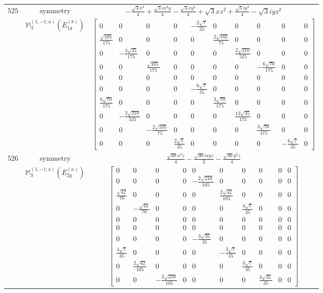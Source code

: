 \documentclass[fleqn,8pt,landscape]{jsarticle}
\begin{document}
\begin{longtable}{ccc}
$ 525 $ & $ \text{symmetry} $ & $ - \frac{\sqrt{3} x^{3}}{4} + \frac{\sqrt{3} i x^{2} y}{4} - \frac{\sqrt{3} x y^{2}}{4} + \sqrt{3} x z^{2} + \frac{\sqrt{3} i y^{3}}{4} - \sqrt{3} i y z^{2} $ \\
$  $ & $ \mathbb{M}_{3}^{(1,-1;a)}(E_{1g}^{(b)}) $ & $ \begin{bmatrix} 0 & 0 & 0 & 0 & - \frac{2 \sqrt{7}}{35} & 0 & 0 & 0 & 0 & 0 \\ \frac{\sqrt{105}}{175} & 0 & 0 & 0 & 0 & \frac{2 \sqrt{105}}{75} & 0 & 0 & 0 & 0 \\ 0 & - \frac{3 \sqrt{35}}{175} & 0 & 0 & 0 & 0 & \frac{2 \sqrt{210}}{525} & 0 & 0 & 0 \\ 0 & 0 & \frac{\sqrt{105}}{175} & 0 & 0 & 0 & 0 & - \frac{6 \sqrt{70}}{175} & 0 & 0 \\ 0 & 0 & 0 & 0 & 0 & 0 & 0 & 0 & 0 & 0 \\ 0 & 0 & 0 & 0 & - \frac{6 \sqrt{7}}{35} & 0 & 0 & 0 & 0 & 0 \\ \frac{6 \sqrt{70}}{175} & 0 & 0 & 0 & 0 & \frac{3 \sqrt{70}}{175} & 0 & 0 & 0 & 0 \\ 0 & - \frac{2 \sqrt{210}}{525} & 0 & 0 & 0 & 0 & \frac{12 \sqrt{35}}{175} & 0 & 0 & 0 \\ 0 & 0 & - \frac{2 \sqrt{105}}{75} & 0 & 0 & 0 & 0 & \frac{3 \sqrt{70}}{175} & 0 & 0 \\ 0 & 0 & 0 & \frac{2 \sqrt{7}}{35} & 0 & 0 & 0 & 0 & - \frac{6 \sqrt{7}}{35} & 0 \end{bmatrix} $ \\ \hline
$ 526 $ & $ \text{symmetry} $ & $ \frac{\sqrt{30} x^{2} z}{4} - \frac{\sqrt{30} i x y z}{2} - \frac{\sqrt{30} y^{2} z}{4} $ \\
$  $ & $ \mathbb{M}_{3}^{(1,-1;a)}(E_{2g}^{(a)}) $ & $ \begin{bmatrix} 0 & 0 & 0 & 0 & 0 & 0 & 0 & 0 & 0 & 0 \\ 0 & 0 & 0 & 0 & - \frac{2 \sqrt{210}}{105} & 0 & 0 & 0 & 0 & 0 \\ \frac{\sqrt{42}}{70} & 0 & 0 & 0 & 0 & \frac{2 \sqrt{42}}{105} & 0 & 0 & 0 & 0 \\ 0 & - \frac{\sqrt{42}}{70} & 0 & 0 & 0 & 0 & \frac{4 \sqrt{7}}{35} & 0 & 0 & 0 \\ 0 & 0 & 0 & 0 & 0 & 0 & 0 & 0 & 0 & 0 \\ 0 & 0 & 0 & 0 & 0 & 0 & 0 & 0 & 0 & 0 \\ 0 & 0 & 0 & 0 & - \frac{3 \sqrt{35}}{35} & 0 & 0 & 0 & 0 & 0 \\ \frac{4 \sqrt{7}}{35} & 0 & 0 & 0 & 0 & - \frac{3 \sqrt{7}}{35} & 0 & 0 & 0 & 0 \\ 0 & \frac{2 \sqrt{42}}{105} & 0 & 0 & 0 & 0 & \frac{3 \sqrt{7}}{35} & 0 & 0 & 0 \\ 0 & 0 & - \frac{2 \sqrt{210}}{105} & 0 & 0 & 0 & 0 & \frac{3 \sqrt{35}}{35} & 0 & 0 \end{bmatrix} $ \\ \hline

\end{longtable}
\end{document}
